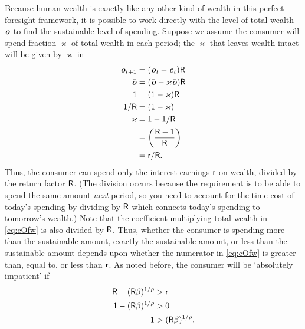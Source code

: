 \documentclass{scrartcl}
\begin{document}
Because human wealth is exactly like any other kind of wealth in this 
perfect foresight framework, it is possible to work directly with the level of total 
wealth $\boldsymbol{\mathit{o}}$ to find the sustainable level of spending.
Suppose we assume the consumer will spend fraction 
$\varkappa$ of total wealth in each period; the 
$\varkappa$ that leaves wealth intact will be given by $\varkappa$ in
\begin{equation*}\begin{gathered}\begin{aligned}
        \boldsymbol{\mathit{o}}_{t+1} & =  (\boldsymbol{\mathit{o}}_{t}-\boldsymbol{\mathit{c}}_{t})\mathsf{R}
\\  \bar{\boldsymbol{\mathit{o}}} & =  (\bar{\boldsymbol{\mathit{o}}}-\varkappa \bar{\boldsymbol{\mathit{o}}})\mathsf{R}
\\      1 & =  (1-\varkappa)  \mathsf{R}
\\      1/\mathsf{R} & =  (1-\varkappa)
\\  \varkappa & =  1-1/\mathsf{R}
\\  & =  \left(\frac{\mathsf{R} -1}{\mathsf{R}}\right)
\\  & =  \mathsf{r}/\mathsf{R} \label{eq:PIHMPC}
.
\end{aligned}\end{gathered}\end{equation*}
Thus, the consumer can spend only the interest earnings $\mathsf{r}$ on 
wealth, divided by the return factor $\mathsf{R}$.
(The division occurs because 
the requirement is to be able to spend the same amount \textit{next} period,
so you need to account for the time cost of today's spending by dividing by $\mathsf{R}$ which
connects today's spending to tomorrow's wealth.)
Note that the coefficient multiplying total wealth in \eqref{eq:cOfw}
is also divided by $\mathsf{R}$.
Thus, whether the consumer is spending
more than the sustainable amount, exactly the sustainable amount, or
less than the sustainable amount depends upon whether the numerator in
\eqref{eq:cOfw} is greater than, equal to, or less than $\mathsf{r}$.
As noted before,
the consumer will be `absolutely impatient' if 
\begin{equation}\begin{gathered}\begin{aligned}
        \mathsf{R}-(\mathsf{R}\beta)^{1/\rho} & >  \mathsf{r}  \\
        1-(\mathsf{R}\beta)^{1/\rho} & >  0  \notag \\
        1 & >  (\mathsf{R}\beta)^{1/\rho}. \notag
\end{aligned}\end{gathered}\end{equation}
\end{document}
